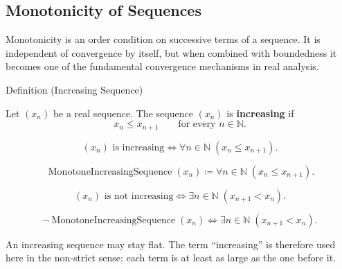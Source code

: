 \subsection*{Monotonicity of Sequences}

\begin{exposition}
Monotonicity is an order condition on successive terms of a sequence. It is
independent of convergence by itself, but when combined with boundedness it
becomes one of the fundamental convergence mechanisms in real analysis.
\end{exposition}


\begin{definitionbox}{Definition (Increasing Sequence)}
\begin{definition}
\label{def:increasing-sequence}
Let $(x_n)$ be a real sequence. The sequence $(x_n)$ is
\textbf{increasing} if
\[
  x_n \le x_{n+1}
  \qquad
  \text{for every } n\in\mathbb{N}.
\]
\end{definition}
\end{definitionbox}

\begin{remark*}
\[
(x_n)\text{ is increasing}
\Longleftrightarrow
\forall n\in\mathbb{N}\;(x_n\le x_{n+1}).
\]
\end{remark*}

\begin{remark*}
\[
\operatorname{MonotoneIncreasingSequence}(x_n)
\coloneqq
\forall n\in\mathbb{N}\;(x_n\le x_{n+1}).
\]
\end{remark*}

\begin{remark*}
\[
(x_n)\text{ is not increasing}
\Longleftrightarrow
\exists n\in\mathbb{N}\;(x_{n+1}<x_n).
\]
\end{remark*}

\begin{remark*}
\[
\neg\operatorname{MonotoneIncreasingSequence}(x_n)
\Longleftrightarrow
\exists n\in\mathbb{N}\;(x_{n+1}<x_n).
\]
\end{remark*}

\begin{remark*}[Interpretation]
An increasing sequence may stay flat. The term ``increasing'' is therefore
used here in the non-strict sense: each term is at least as large as the one
before it.
\end{remark*}

